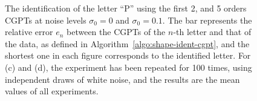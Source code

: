 \begin{figure}[htp]
  \centering
  \caption{The identification of the letter ``P'' using the first 2,
    and 5 orders CGPTs at noise levels $\sigma_0=0$ and
    $\sigma_0=0.1$. The bar represents the relative error $e_n$
    between the CGPTs of the $n$-th letter and that of the data, as
    defined in Algorithm~\ref{algo:shape-ident-cgpt}, and the shortest
    one in each figure corresponds to the identified letter. For (c)
    and (d), the experiment has been repeated for 100 times, using
    independent draws of white noise, and the results are the mean
    values of all experiments.}
  \label{fig:matching_letter_p}
\end{figure}

